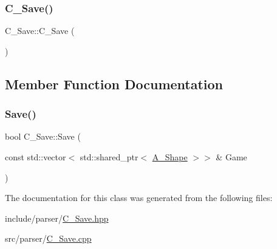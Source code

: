 \subsubsection{\texorpdfstring{C\+\_\+\+Save()}{C\_Save()}}
{\footnotesize\ttfamily C\+\_\+\+Save\+::\+C\+\_\+\+Save (\begin{DoxyParamCaption}{ }\end{DoxyParamCaption})}



\subsection{Member Function Documentation}
\mbox{\label{classC__Save_a144be848679b771afb9cf410710308e8}} 
\subsubsection{\texorpdfstring{Save()}{Save()}}
{\footnotesize\ttfamily bool C\+\_\+\+Save\+::\+Save (\begin{DoxyParamCaption}\item[{const std\+::vector$<$ std\+::shared\+\_\+ptr$<$ \hyperlink{classA__Shape}{A\+\_\+\+Shape} $>$$>$ \&}]{Game }\end{DoxyParamCaption})}



The documentation for this class was generated from the following files\+:\begin{DoxyCompactItemize}
\item 
include/parser/\hyperlink{C__Save_8hpp}{C\+\_\+\+Save.\+hpp}\item 
src/parser/\hyperlink{C__Save_8cpp}{C\+\_\+\+Save.\+cpp}\end{DoxyCompactItemize}
